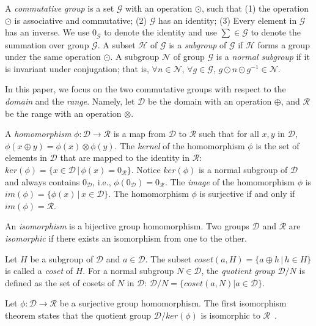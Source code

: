 A {\it commutative group} is a set $\mathcal{G}$ with an operation $\odot$, such that (1) the operation $\odot$ is associative and commutative; (2) $\mathcal{G}$ has an identity; (3) Every element in $\mathcal{G}$ has an inverse. We use $0_{\mathcal{G}}$ to denote the identity and use $\sum \in \mathcal{G}$ to denote the summation over group $\mathcal{G}$. A subset ${\mathcal{H}}$ of ${\mathcal{G}}$ is a {\it subgroup} of ${\mathcal{G}}$ if ${\mathcal{H}}$ forms a group under the same operation $\odot$. A subgroup ${\mathcal{N}}$ of group ${\mathcal{G}}$ is a {\it normal subgroup} if it is invariant under conjugation; that is, $\forall n \in {\mathcal{N}}$, $\forall g \in {\mathcal{G}}$,  $g \odot n \odot g^{-1} \in  {\mathcal{N}}$.

In this paper, we focus on the two commutative groups with respect to the {\it domain} and the {\it range}. Namely, let $\mathcal{D}$ be the domain with an operation $\oplus$, and $\mathcal{R}$ be the range with an operation $\otimes$.

A {\it homomorphism} $\phi: \mathcal{D} \rightarrow \mathcal{R}$ is a map from $\mathcal{D}$ to $\mathcal{R}$ such that for all $x, y$ in $\mathcal{D}$, $\phi(x \oplus y) = \phi(x) \otimes \phi(y)$. The {\it kernel} of the homomorphism $\phi$ is the set of elements in $\mathcal{D}$ that are mapped to the identity in $\mathcal{R}$:  $ker ( \phi)=\{x \in \mathcal{D}\, | \, \phi(x)=0_{\mathcal{R}}  \}$. Notice $ker(\phi)$ is a normal subgroup of $\mathcal{D}$ and always contains $0_{\mathcal{D}}$, i.e., $\phi(0_{\mathcal{D}}) = 0_{\mathcal{R}}$. The {\it image} of the homomorphism $\phi$ is $im (\phi) = \{\phi(x)\,| \, x \in \mathcal{D}\}$. The homomorphism $\phi$ is surjective if and only if $im ( \phi) = \mathcal{R}$.

An {\it isomorphism} is a bijective group homomorphism. Two groups $\mathcal{D}$ and $\mathcal{R}$ are {\it isomorphic} if there exists an isomorphism from one to the other.

Let $H$ be a subgroup of $\mathcal{D}$ and $a \in \mathcal{D}$. The subset $coset(a,H) =\{a \oplus h \,| \, h \in H\}$ is called a {\it coset} of $H$. For a normal subgroup $N \in \mathcal{D}$, the {\it quotient group} $ \mathcal{D} / N$ is defined as the set of cosets of $N$ in $\mathcal{D}$: $\mathcal{D} / N=\{coset(a,N) | a\in \mathcal{D}\}$. 

Let $\phi: \mathcal{D} \rightarrow \mathcal{R}$ be a surjective group homomorphism. The first isomorphism theorem states that 
the quotient group $\mathcal{D} / ker(\phi)$ is isomorphic to $\mathcal{R}$~\cite{algebrabook}.

